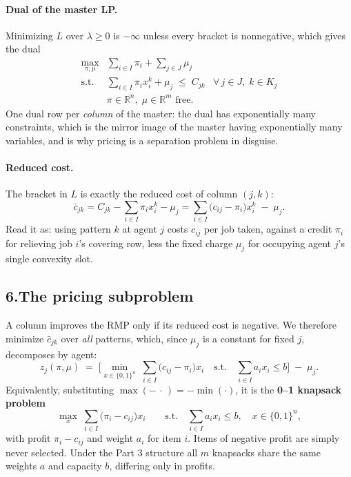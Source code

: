 \documentclass[11pt]{article}
\DeclareMathOperator*{\minimize}{min}
\DeclareMathOperator*{\maximize}{max}
\theoremstyle{definition}
\theoremstyle{plain}
\begin{document}
\paragraph{Dual of the master LP.} Minimizing $L$ over $\lambda \ge 0$
is $-\infty$ unless every bracket is nonnegative, which gives the dual
\[
  \boxed{
  \begin{array}{llr}
    \maximize\limits_{\pi, \mu} &
      \displaystyle \sum_{i \in I} \pi_i + \sum_{j \in J} \mu_j & \\[8pt]
    \text{s.t.} &
      \displaystyle \sum_{i \in I} \pi_i x^k_i + \mu_j \;\le\; C_{jk}
      & \forall\, j \in J,\; k \in K_j \\[8pt]
    & \pi \in \mathbb{R}^n,\; \mu \in \mathbb{R}^m \text{ free.} &
  \end{array}}
\]
One dual row per \emph{column} of the master: the dual has exponentially
many constraints, which is the mirror image of the master having
exponentially many variables, and is why pricing is a separation problem
in disguise.

\paragraph{Reduced cost.} The bracket in $L$ is exactly the reduced cost
of column $(j,k)$:
\[
  \boxed{\;
  \bar{c}_{jk}
  = C_{jk} - \sum_{i \in I} \pi_i x^k_i - \mu_j
  = \sum_{i \in I} \big( c_{ij} - \pi_i \big) x^k_i \;-\; \mu_j . \;}
\]
Read it as: using pattern $k$ at agent $j$ costs $c_{ij}$ per job taken,
against a credit $\pi_i$ for relieving job $i$'s covering row, less the
fixed charge $\mu_j$ for occupying agent $j$'s single convexity slot.

\subsection*{6.\quad The pricing subproblem}

A column improves the RMP only if its reduced cost is negative. We
therefore minimize $\bar{c}_{jk}$ over \emph{all} patterns, which, since
$\mu_j$ is a constant for fixed $j$, decomposes by agent:
\[
  \boxed{\;
  z_j(\pi,\mu) \;=\;
  \Big[ \minimize_{x \in \{0,1\}^n} \;
      \sum_{i \in I} \big( c_{ij} - \pi_i \big) x_i
    \quad \text{s.t.} \quad \sum_{i \in I} a_i x_i \le b \Big]
  \;-\; \mu_j . \;}
\]
Equivalently, substituting $\max(-\,\cdot\,) = -\min(\cdot)$, it is the
\textbf{0--1 knapsack problem}
\[
  \maximize_{x} \; \sum_{i \in I} \big( \pi_i - c_{ij} \big) x_i
  \qquad \text{s.t.} \quad \sum_{i \in I} a_i x_i \le b,
  \quad x \in \{0,1\}^n ,
\]
with profit $\pi_i - c_{ij}$ and weight $a_i$ for item $i$. Items of
negative profit are simply never selected. Under the Part 3 structure
all $m$ knapsacks share the same weights $a$ and capacity $b$, differing
only in profits.
\end{document}
